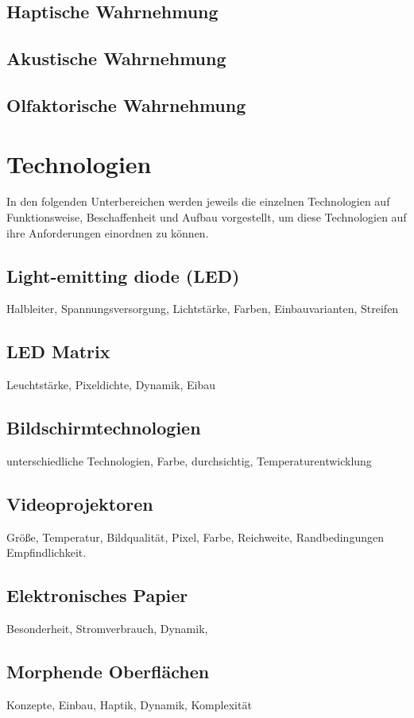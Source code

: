 \subsection{Haptische Wahrnehmung}
\subsection{Akustische Wahrnehmung}
\subsection{Olfaktorische Wahrnehmung}

\section{Technologien}
In den folgenden Unterbereichen werden jeweils die einzelnen Technologien auf Funktionsweise, Beschaffenheit und Aufbau vorgestellt, um diese Technologien auf ihre Anforderungen einordnen zu können.
\subsection{Light-emitting diode (LED)}
Halbleiter, Spannungsversorgung, Lichtstärke, Farben, Einbauvarianten, Streifen
\subsection{LED Matrix}
Leuchtstärke, Pixeldichte, Dynamik, Eibau
\subsection{Bildschirmtechnologien}
unterschiedliche Technologien, Farbe, durchsichtig, Temperaturentwicklung
\subsection{Videoprojektoren}
Größe, Temperatur, Bildqualität, Pixel, Farbe, Reichweite, Randbedingungen Empfindlichkeit.
\subsection{Elektronisches Papier}
Besonderheit, Stromverbrauch, Dynamik,
\subsection{Morphende Oberflächen}
Konzepte, Einbau, Haptik, Dynamik, Komplexität

